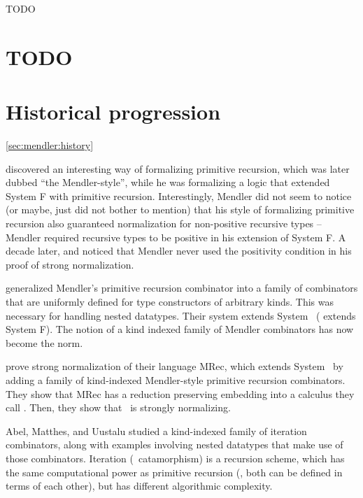 TODO



\section{TODO} \label{sec:mgadt}









\section{Historical progression}\ref{sec:mendler:history}

\citet{Mendler87} discovered an interesting way of formalizing
primitive recursion, which was later dubbed ``the Mendler-style'',
while he was formalizing a logic that extended System \textsf{F} with
primitive recursion. Interestingly, Mendler did not seem to notice
(or maybe, just did not bother to mention) that his style of formalizing
primitive recursion also guaranteed normalization for non-positive recursive
types -- Mendler required recursive types to be positive in his extension of
System \textsf{F}. A decade later, \citet{matthes98phd} and \citet{uustalu98phd}
noticed that Mendler never used the positivity condition in his proof of
strong normalization.

\citet{AbeMat04} generalized Mendler's primitive recursion combinator
\cite{Mendler87} into a family of combinators that are uniformly defined for
type constructors of arbitrary kinds. This was necessary for
handling nested datatypes. Their system extends System \Fw\ 
(\citet{Mendler87} extends System \textsf{F}). The notion
of a kind indexed family of Mendler combinators has now become the norm.

\citet{AbeMat04} prove strong normalization of their language \textsf{MRec},
which extends System \Fw\ by adding a family of kind-indexed Mendler-style
primitive recursion combinators. They show that \textsf{MRec} has
a reduction preserving embedding into a calculus they call \Fixw.
Then, they show that \Fixw\ is strongly normalizing.

Abel, Matthes, and Uustalu \cite{AbeMatUus03,AbeMatUus05} studied
a kind-indexed family of iteration combinators, along with examples
involving nested datatypes that make use of those combinators.
Iteration (\aka\ catamorphism) is a recursion scheme, which has the same
computational power as primitive recursion (\ie, both can be defined
in terms of each other), but has different algorithmic complexity. 

